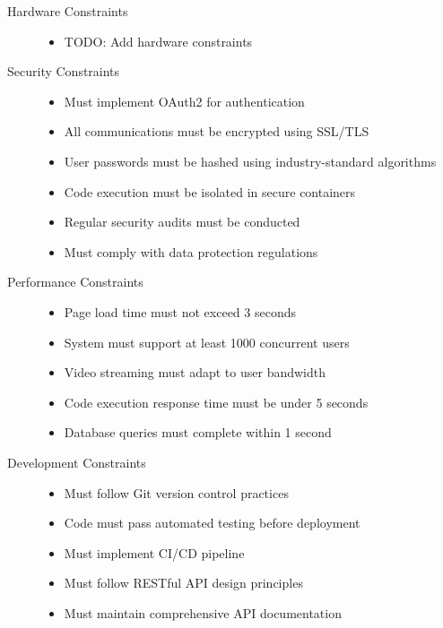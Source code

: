 \documentclass[a4paper, 11pt]{scrreprt}
\begin{document}
\begin{description}
    \item[Hardware Constraints]\mbox{}
        \begin{itemize}
            \item TODO: Add hardware constraints
        \end{itemize}
    
    \item[Security Constraints]\mbox{}
        \begin{itemize}
            \item Must implement OAuth2 for authentication
            \item All communications must be encrypted using SSL/TLS
            \item User passwords must be hashed using industry-standard algorithms
            \item Code execution must be isolated in secure containers
            \item Regular security audits must be conducted
            \item Must comply with data protection regulations
        \end{itemize}
    
    \item[Performance Constraints]\mbox{}
        \begin{itemize}
            \item Page load time must not exceed 3 seconds
            \item System must support at least 1000 concurrent users
            \item Video streaming must adapt to user bandwidth
            \item Code execution response time must be under 5 seconds
            \item Database queries must complete within 1 second
        \end{itemize}
    
    \item[Development Constraints]\mbox{}
        \begin{itemize}
            \item Must follow Git version control practices
            \item Code must pass automated testing before deployment
            \item Must implement CI/CD pipeline
            \item Must follow RESTful API design principles
            \item Must maintain comprehensive API documentation
        \end{itemize}
    

\end{description}
\end{document}
